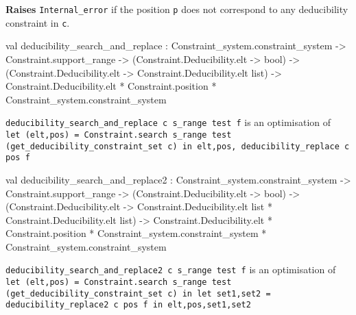\begin{ocamldocsigend}
\begin{ocamldocdescription}
{\bf Raises} {\tt{Internal\_error}} if the position {\tt{p}} does not correspond to any deducibility constraint in {\tt{c}}.


\end{ocamldocdescription}


\label{val:Constraint-underscoresystem.Phase-underscore1.deducibility-underscoresearch-underscoreand-underscorereplace}\begin{ocamldoccode}
val deducibility_search_and_replace :
  Constraint_system.constraint_system ->
  Constraint.support_range ->
  (Constraint.Deducibility.elt -> bool) ->
  (Constraint.Deducibility.elt -> Constraint.Deducibility.elt list) ->
  Constraint.Deducibility.elt * Constraint.position *
  Constraint_system.constraint_system
\end{ocamldoccode}
\begin{ocamldocdescription}
{\tt{deducibility\_search\_and\_replace c s\_range test f}} is an optimisation of
{\tt{{} let (elt,pos) = Constraint.search s\_range test (get\_deducibility\_constraint\_set c) in\
elt,pos, deducibility\_replace c pos f{}}}


\end{ocamldocdescription}


\label{val:Constraint-underscoresystem.Phase-underscore1.deducibility-underscoresearch-underscoreand-underscorereplace2}\begin{ocamldoccode}
val deducibility_search_and_replace2 :
  Constraint_system.constraint_system ->
  Constraint.support_range ->
  (Constraint.Deducibility.elt -> bool) ->
  (Constraint.Deducibility.elt ->
   Constraint.Deducibility.elt list * Constraint.Deducibility.elt list) ->
  Constraint.Deducibility.elt * Constraint.position *
  Constraint_system.constraint_system * Constraint_system.constraint_system
\end{ocamldoccode}
\begin{ocamldocdescription}
{\tt{deducibility\_search\_and\_replace2 c s\_range test f}} is an optimisation of
{\tt{{\char123} let (elt,pos) = Constraint.search s\_range test (get\_deducibility\_constraint\_set c) in\
let set1,set2 = deducibility\_replace2 c pos f in\
elt,pos,set1,set2{}}}


\end{ocamldocdescription}



\end{ocamldocsigend}
